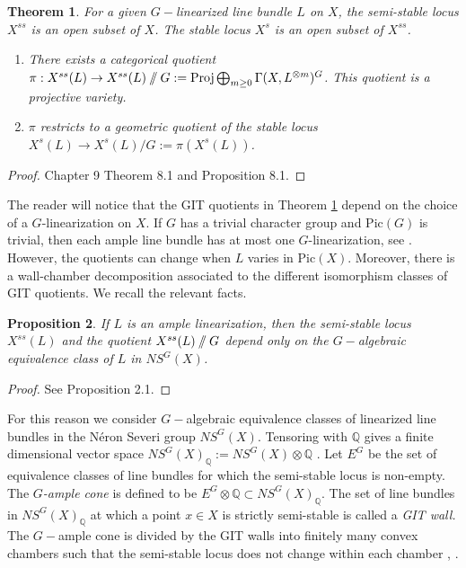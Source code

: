 \documentclass{amsart}
\newcommand{\Q}{\mathbb{Q}}
\newcommand{\sslash}{\mathbin{/\mkern-6mu/}}
\newcommand{\proj}{\text{Proj}}
\numberwithin{equation}{section}
\newtheorem{prop}{Proposition}[section]
\newtheorem{thm}[prop]{Theorem}
\theoremstyle{definition}
\begin{document}
\begin{thm}\label{theorem:GIT_quotients}
    For a given $G-$linearized line bundle $L$ on $X$, the semi-stable locus $X^{ss}$ is an open subset of $X$. The stable locus $X^s$ is an open subset of $X^{ss}$.
    
    \begin{enumerate}[label=\arabic*)]
        \item There exists a categorical quotient $\pi: X^{ss}(L) \rightarrow X^{ss}(L) \sslash G := \proj \bigoplus_{m\geq 0} \Gamma(X, L^{\otimes m})^G $. This quotient is a projective variety.
        \item $\pi$ restricts to a geometric quotient of the stable locus $X^s (L) \rightarrow X^s (L) \slash G := \pi(X^s(L)) $.
    \end{enumerate}
    
\end{thm}
\begin{proof}
    \cite{Dol03} Chapter 9 Theorem 8.1 and Proposition 8.1.
\end{proof}

The reader will notice that the GIT quotients in Theorem \ref{theorem:GIT_quotients} depend on the choice of a $G$-linearization on $X$. If $G$ has a trivial character group and $\text{Pic}(G)$ is trivial, then each ample line bundle has at most one $G$-linearization, see \cite[Section 7]{Dol03}. However,  the quotients can change when $L$ varies in $\text{Pic}(X)$. Moreover, there is a wall-chamber decomposition associated to the different isomorphism classes of GIT quotients. We recall the relevant facts.

\begin{prop}
    If $L$ is an ample linearization, then the semi-stable locus $X^{ss}(L)$ and the quotient $X^{ss}(L) \sslash G$ depend only on the $G-$algebraic equivalence class of $L$ in $NS^G(X)$.
\end{prop}

\begin{proof}
   See \cite{Tha96} Proposition 2.1.
\end{proof}

For this reason we consider $G-$algebraic equivalence classes of linearized line bundles in the N\'eron Severi group $NS^G(X)$. Tensoring with $\Q$ gives a finite dimensional vector space $NS^G(X)_\Q:= NS^G(X) \otimes \Q$ \cite[Section 2]{Tha96}. Let $E^G$ be the set of equivalence classes of line bundles for which the semi-stable locus is non-empty. The \textit{$G$-ample cone} is defined to be $E^G \otimes \Q \subset NS^G (X)_{\Q}.$ The set of line bundles in $NS^G(X)_{\Q}$ at which a point $x \in X$ is strictly semi-stable is called a \textit{GIT wall.} The $G-$ample cone is divided by the GIT walls into finitely many convex chambers such that the semi-stable locus does not change within each chamber \cite{Tha96}, \cite{DH98}.
\end{document}
